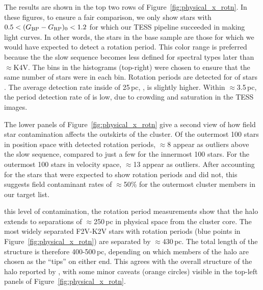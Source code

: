 \documentclass[12pt,twocolumn,tighten]{aastex63}
\newcommand{\bpmrpo}{(G_{\rm BP}-G_{\rm RP})_0}
\begin{document}
The results are shown in the top two rows of
Figure~\ref{fig:physical_x_rotn}.    In
 these figures, to ensure a fair comparison, we only show
stars with $0.5<\bpmrpo<1.2$ for which our TESS pipeline succeeded in
making light curves.  In other words, the stars in the base sample are
those for which we would have expected to detect a rotation period.
This color range is preferred because the the slow sequence becomes
less defined for spectral types later than $\approx$K4V.  The bins in
the histograms (top-right) were chosen to ensure that the same number
of stars were in each bin.  Rotation periods  are detected for
 of stars .  The average
detection rate inside of 25\,pc, , is
slightly higher. Within $\approx$3.5\,pc, the period detection
rate of  is
 low, due to crowding and saturation
in the TESS images.

The lower panels of Figure~\ref{fig:physical_x_rotn} give a second
view of how field star contamination affects the outskirts of the
cluster.  Of the outermost 100 stars in position space with detected
rotation periods, $\approx$8 appear as
outliers above the slow sequence, compared to just a few for the
innermost 100 stars.  For the outermost 100 stars in velocity space,
$\approx$13 appear as outliers.  After accounting for the stars that were
expected to show rotation periods and did not, this suggests field
contaminant rates of $\approx$50\% for the outermost cluster members in
our  target list.

 this level of contamination, the rotation period
measurements show that the halo extends to separations of
$\approx$250\,pc in physical space from the cluster core.  The most
widely separated F2V-K2V stars with rotation periods (blue points in
Figure~\ref{fig:physical_x_rotn}) are separated by $\approx$430\,pc.
The total length of the structure is therefore 400-500\,pc, depending
on which members of the halo are chosen as the ``tips'' on either end.
This agrees with the overall structure of the halo reported by
, with some minor caveats (orange
circles) visible in the top-left panels of
Figure~\ref{fig:physical_x_rotn}.
\end{document}
